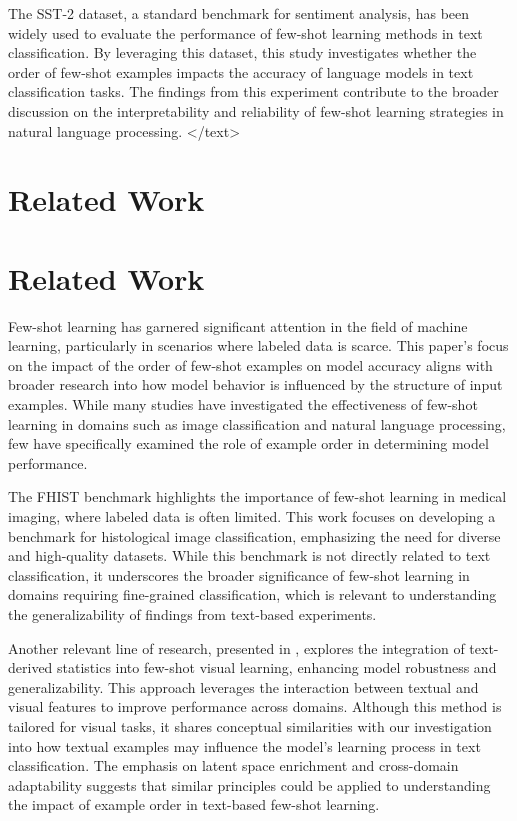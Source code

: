 \documentclass{article}
\begin{document}
The SST-2 dataset, a standard benchmark for sentiment analysis, has been widely used to evaluate the performance of few-shot learning methods in text classification. By leveraging this dataset, this study investigates whether the order of few-shot examples impacts the accuracy of language models in text classification tasks. The findings from this experiment contribute to the broader discussion on the interpretability and reliability of few-shot learning strategies in natural language processing.
</text>
\section{Related Work}
\section{Related Work}

Few-shot learning has garnered significant attention in the field of machine learning, particularly in scenarios where labeled data is scarce. This paper's focus on the impact of the order of few-shot examples on model accuracy aligns with broader research into how model behavior is influenced by the structure of input examples. While many studies have investigated the effectiveness of few-shot learning in domains such as image classification and natural language processing, few have specifically examined the role of example order in determining model performance.

The FHIST benchmark \citep{2206.00092v1} highlights the importance of few-shot learning in medical imaging, where labeled data is often limited. This work focuses on developing a benchmark for histological image classification, emphasizing the need for diverse and high-quality datasets. While this benchmark is not directly related to text classification, it underscores the broader significance of few-shot learning in domains requiring fine-grained classification, which is relevant to understanding the generalizability of findings from text-based experiments.

Another relevant line of research, presented in \citet{2311.14544v1}, explores the integration of text-derived statistics into few-shot visual learning, enhancing model robustness and generalizability. This approach leverages the interaction between textual and visual features to improve performance across domains. Although this method is tailored for visual tasks, it shares conceptual similarities with our investigation into how textual examples may influence the model's learning process in text classification. The emphasis on latent space enrichment and cross-domain adaptability suggests that similar principles could be applied to understanding the impact of example order in text-based few-shot learning.
\end{document}
